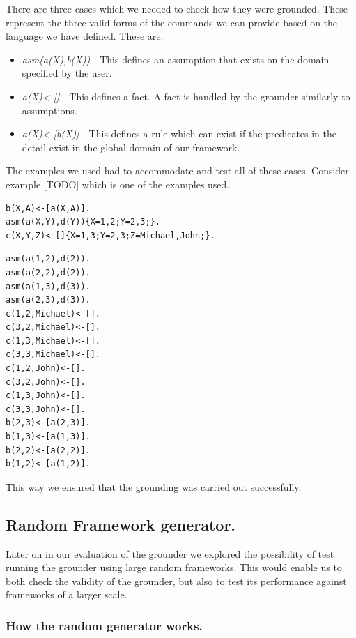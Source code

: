 There are three cases which we needed to check how they were grounded. These represent the three valid forms of the commands we can provide based on the language we have defined. These are:

\begin{itemize}
\item \emph{asm(a(X),b(X))} - This defines an assumption that exists on the domain specified by the user.
\item \emph{a(X)\textless-[]} - This defines a fact. A fact is handled by the grounder similarly to assumptions.
\item \emph{a(X)\textless-[b(X)]} - This defines a rule which can exist if the predicates in the detail exist in the global domain of our framework.
\end{itemize}

The examples we used had to accommodate and test all of these cases. Consider example [TODO] which is one of the examples used.

\begin{Verbatim}[frame=single]
b(X,A)<-[a(X,A)].
asm(a(X,Y),d(Y)){X=1,2;Y=2,3;}.
c(X,Y,Z)<-[]{X=1,3;Y=2,3;Z=Michael,John;}.
\end{Verbatim}

\begin{Verbatim}[frame=single]
asm(a(1,2),d(2)).
asm(a(2,2),d(2)).
asm(a(1,3),d(3)).
asm(a(2,3),d(3)).
c(1,2,Michael)<-[].
c(3,2,Michael)<-[].
c(1,3,Michael)<-[].
c(3,3,Michael)<-[].
c(1,2,John)<-[].
c(3,2,John)<-[].
c(1,3,John)<-[].
c(3,3,John)<-[].
b(2,3)<-[a(2,3)].
b(1,3)<-[a(1,3)].
b(2,2)<-[a(2,2)].
b(1,2)<-[a(1,2)].
\end{Verbatim}

This way we ensured that the grounding was carried out successfully. 

\subsection{Random Framework generator.}
Later on in our evaluation of the grounder we explored the possibility of test running the grounder using large random frameworks. This would enable us to both check the validity of the grounder, but also to test its performance against frameworks of a larger scale.

\subsubsection{How the random generator works.}

